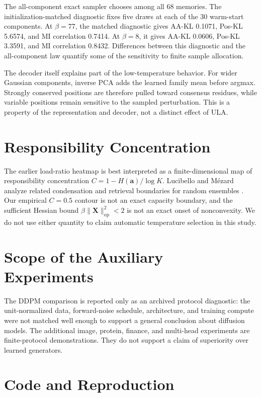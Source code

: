 The all-component exact sampler chooses among all 68 memories. The
initialization-matched diagnostic fixes five draws at each of the 30
warm-start components. At $\beta=77$, the matched diagnostic gives AA-KL
0.1071, Pos-KL 5.6574, and MI correlation 0.7414. At $\beta=8$, it gives AA-KL
0.0606, Pos-KL 3.3591, and MI correlation 0.8432. Differences between this
diagnostic and the all-component law quantify some of the sensitivity to
finite sample allocation.

The decoder itself explains part of the low-temperature behavior. For wider
Gaussian components, inverse PCA adds the learned family mean before argmax.
Strongly conserved positions are therefore pulled toward consensus residues,
while variable positions remain sensitive to the sampled perturbation. This is
a property of the representation and decoder, not a distinct effect of ULA.

\section{Responsibility Concentration}
\label{app:responsibility-concentration}

The earlier load-ratio heatmap is best interpreted as a finite-dimensional map
of responsibility concentration
$C=1-H(\mathbf a)/\log K$. Lucibello and M\'ezard analyze related condensation
and retrieval boundaries for random ensembles
\cite{lucibelloExponentialCapacityDense2024}. Our empirical $C=0.5$ contour is
not an exact capacity boundary, and the sufficient Hessian bound
$\beta\lVert\mathbf X\rVert_{\mathrm{op}}^2<2$ is not an exact onset of
nonconvexity. We do not use either quantity to claim automatic temperature
selection in this study.

\section{Scope of the Auxiliary Experiments}
\label{app:removed-experiments}

The DDPM comparison is reported only as an archived protocol diagnostic: the
unit-normalized data, forward-noise schedule, architecture, and training compute
were not matched well enough to support a general conclusion about diffusion
models. The additional image, protein, finance, and multi-head experiments are
finite-protocol demonstrations. They do not support a claim of superiority over
learned generators.

\section{Code and Reproduction}
\label{app:code}

